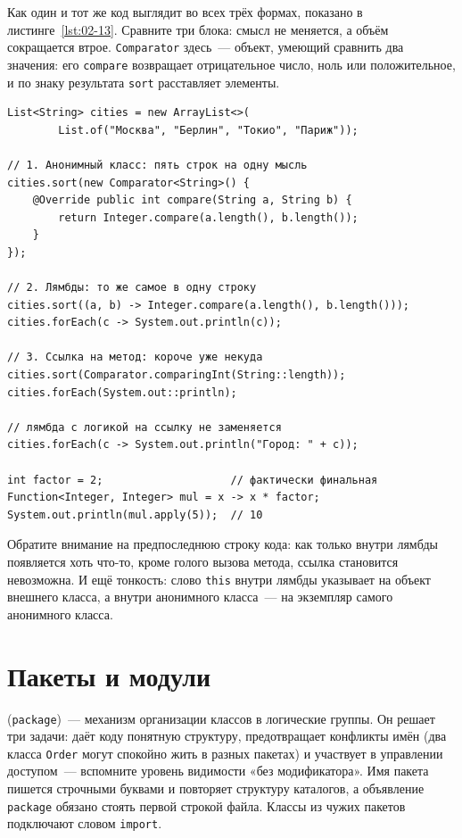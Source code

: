 Как один и тот же код выглядит во всех трёх формах, показано в
листинге~\ref{lst:02-13}. Сравните три блока: смысл не меняется, а объём
сокращается втрое. \texttt{Comparator} здесь~--- объект, умеющий сравнить два
значения: его \texttt{compare} возвращает отрицательное число, ноль или
положительное, и по знаку результата \texttt{sort} расставляет элементы.

\begin{listing}[H]
\begin{verbatim}
List<String> cities = new ArrayList<>(
        List.of("Москва", "Берлин", "Токио", "Париж"));

// 1. Анонимный класс: пять строк на одну мысль
cities.sort(new Comparator<String>() {
    @Override public int compare(String a, String b) {
        return Integer.compare(a.length(), b.length());
    }
});

// 2. Лямбды: то же самое в одну строку
cities.sort((a, b) -> Integer.compare(a.length(), b.length()));
cities.forEach(c -> System.out.println(c));

// 3. Ссылка на метод: короче уже некуда
cities.sort(Comparator.comparingInt(String::length));
cities.forEach(System.out::println);

// лямбда с логикой на ссылку не заменяется
cities.forEach(c -> System.out.println("Город: " + c));

int factor = 2;                    // фактически финальная
Function<Integer, Integer> mul = x -> x * factor;
System.out.println(mul.apply(5));  // 10
\end{verbatim}
\caption{От анонимного класса к лямбде и ссылке на метод}
\label{lst:02-13}
\end{listing}

Обратите внимание на предпоследнюю строку кода: как только внутри лямбды
появляется хоть что-то, кроме голого вызова метода, ссылка становится
невозможна. И ещё тонкость: слово \texttt{this} внутри лямбды указывает на
объект внешнего класса, а внутри анонимного класса~--- на экземпляр самого
анонимного класса.

\section{Пакеты и модули}

 (\texttt{package})~--- механизм организации классов в логические
группы. Он решает три задачи: даёт коду понятную структуру, предотвращает
конфликты имён (два класса \texttt{Order} могут спокойно жить в разных пакетах)
и участвует в управлении доступом~--- вспомните уровень видимости «без
модификатора». Имя пакета пишется строчными буквами и повторяет структуру
каталогов, а объявление \texttt{package} обязано стоять первой строкой файла.
Классы из чужих пакетов подключают словом \texttt{import}.

